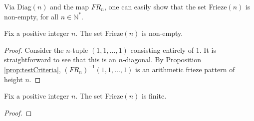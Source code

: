 Via Diag$(n)$ and the map $FR_n$, one can easily show that the set Frieze$(n)$ is non-empty, for all $n \in \mathbb{N}^*$.
\begin{lemma}
    \label{l:friezeNonEmpty}
    Fix a positive integer $n$. The set Frieze$(n)$ is non-empty.
\end{lemma}
\begin{proof}
    Consider the $n$-tuple $(1,1,\ldots, 1)$ consisting entirely of $1$. It is straightforward to see that this is an 
    $n$-diagonal. By Proposition \ref{prop:testCriteria}, $(FR_n)^{-1}(1,1,\ldots, 1)$ is an arithmetic frieze pattern of 
    height $n$.
\end{proof}
\begin{proposition}
    \label{prop:friezeFinite}
    Fix a positive integer $n$. The set Frieze$(n)$ is finite. 
\end{proposition}
\begin{proof}

\end{proof}